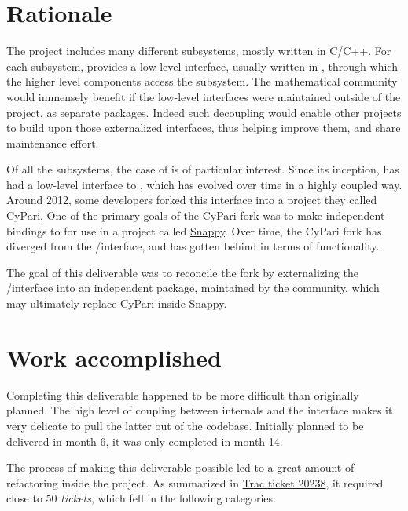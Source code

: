 \documentclass{deliverablereport}
\author{Luca De Feo, Vincent Delecroix, and Jeroen Demeyer}
\begin{document}
\enlargethispage{4ex}
\maketitle
\githubissuedescription
\tableofcontents\newpage


\section{Rationale}

The \Sage project includes many different subsystems, mostly written
in C/C++. For each subsystem, \Sage provides a low-level interface,
usually written in \Cython, through which the higher level components
access the subsystem. The mathematical community would immensely
benefit if the low-level interfaces were maintained outside of the
\Sage project, as separate \Python packages. Indeed such decoupling
would enable other \Python projects to build upon those externalized
interfaces, thus helping improve them, and share maintenance effort.

Of all the subsystems, the case of \Pari is of particular
interest. Since its inception, \Sage has had a low-level \Cython
interface to \Pari, which has evolved over time in a highly coupled
way. Around 2012, some \Sage developers forked this interface into a
project they called
\href{https://bitbucket.org/t3m/cypari/}{CyPari}. One of the primary
goals of the CyPari fork was to make independent \Python bindings to
\Pari for use in a project called
\href{https://bitbucket.org/t3m/snappy}{Snappy}. Over time, the CyPari
fork has diverged from the \Sage/\Pari interface, and has gotten
behind in terms of functionality.

The goal of this deliverable was to reconcile the fork by
externalizing the \Sage/\Pari interface into an independent package,
maintained by the \Sage community, which may ultimately replace CyPari
inside Snappy. 


\section{Work accomplished}

Completing this deliverable happened to be more difficult than
originally planned. The high level of coupling between \Sage internals
and the \Pari interface makes it very delicate to pull the latter out
of the \Sage codebase. Initially planned to be delivered in month 6,
it was only completed in month 14.

The process of making this deliverable possible led to a great amount
of refactoring inside the \Sage project. As summarized in
\href{http://trac.sagemath.org/ticket/20238}{Trac ticket 20238}, it
required close to 50 \emph{tickets}, which fell in the following
categories:
\end{document}
